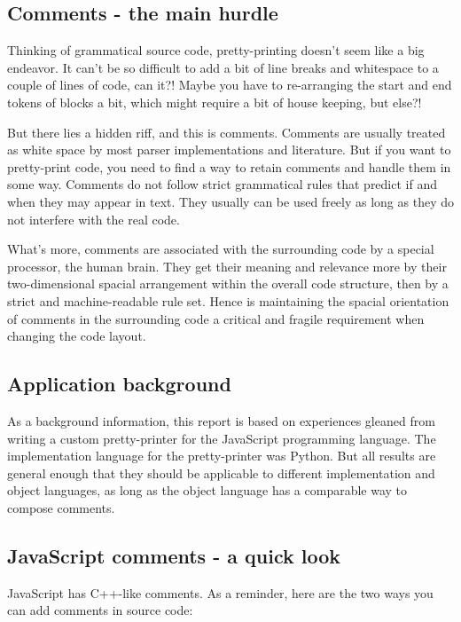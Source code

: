 \documentclass[11pt,a4paper]{article}
\begin{document}
 
\subsection{Comments - the main hurdle}

Thinking of grammatical source code, pretty-printing doesn't seem like a big
endeavor. It can't be so difficult to add a bit of line breaks and whitespace to
a couple of lines of code, can it?! Maybe you have to re-arranging the start and
end tokens of blocks a bit, which might require a bit of house keeping, but else?!

But there lies a hidden riff, and this is comments.  Comments are usually
treated as white space by most parser implementations and literature. But if you
want to pretty-print code, you need to find a way to retain comments and handle
them in some way. Comments do not follow strict grammatical rules that predict
if and when they may appear in text. They usually can be used freely as long as
they do not interfere with the real code.

What's more, comments are associated with the surrounding code by a special
processor, the human brain. They get their meaning and relevance more by their
two-dimensional spacial arrangement within the overall code structure, then by
a strict and machine-readable rule set. Hence is maintaining the spacial
orientation of comments in the surrounding code a critical and fragile
requirement when changing the code layout.


\subsection{Application background}

As a background information, this report is based on experiences gleaned from
writing a custom pretty-printer for the JavaScript programming language. The
implementation language for the pretty-printer was Python. But all results are
general enough that they should be applicable to different implementation and
object languages, as long as the object language has a comparable way to compose
comments.

\subsection{JavaScript comments - a quick look}

JavaScript has C++-like comments. As a reminder, here are the two ways you
can add comments in source code:
\end{document}
